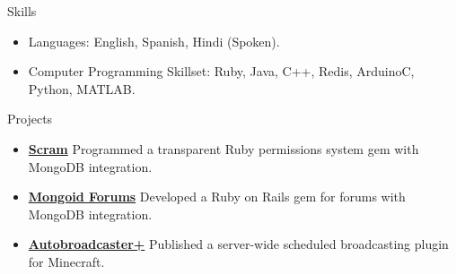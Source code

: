 \documentclass[]{mcdowellcv}
\begin{document}
    \begin{cvsection}{Skills}
        \begin{cvsubsection}{}{}{}
            \begin{itemize}
                \item Languages: English, Spanish, Hindi (Spoken).
            \end{itemize}
            \begin{itemize}
                \item Computer Programming Skillset:  Ruby, Java, C++, Redis, ArduinoC, Python, MATLAB.
            \end{itemize}
        \end{cvsubsection}
    \end{cvsection}
    \begin{cvsection}{Projects}
        \begin{cvsubsection}{}{}{}
            \begin{itemize}
                \setlength\itemsep{3pt}
                \item \textbf{\href{https://github.com/neiljohari/scram}{Scram}}  Programmed a transparent Ruby permissions system gem with MongoDB integration.
                \item \textbf{\href{https://github.com/NJayDevelopment/mongoid_forums) }{Mongoid Forums}} Developed a Ruby on Rails gem for forums with MongoDB integration.
                \item \textbf{\href{https://dev.bukkit.org/projects/abp}{Autobroadcaster+}}  Published a server-wide scheduled broadcasting plugin for Minecraft.
            \end{itemize}
        \end{cvsubsection}
    \end{cvsection}
\end{document}
